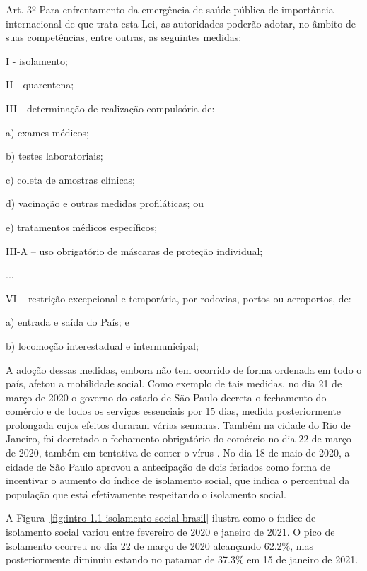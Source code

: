 \begin{citacao}
Art. 3º  Para enfrentamento da emergência de saúde pública de importância internacional de que trata esta Lei, as autoridades poderão adotar, no âmbito de suas competências, entre outras, as seguintes medidas:

I - isolamento;

II - quarentena;

III - determinação de realização compulsória de:

a) exames médicos;
    
b) testes laboratoriais;
    
c) coleta de amostras clínicas;
    
d) vacinação e outras medidas profiláticas; ou 
    
e) tratamentos médicos específicos;
    
III-A – uso obrigatório de máscaras de proteção individual; 

...

VI – restrição excepcional e temporária, por rodovias, portos ou aeroportos, de: 

a) entrada e saída do País; e
    
b) locomoção interestadual e intermunicipal;
\end{citacao}

A adoção dessas medidas, embora não tem ocorrido de forma ordenada em todo o país, afetou a mobilidade social. Como exemplo de tais medidas, no dia 21 de março de 2020 o governo do estado de São Paulo \cite{artigo:folha:sp-fechamento-comercio} decreta o fechamento do comércio e de todos os serviços essenciais por 15 dias, medida posteriormente prolongada cujos efeitos duraram várias semanas. Também na cidade do Rio de Janeiro, foi decretado o fechamento obrigatório do comércio no dia 22 de março de 2020, também em tentativa de conter o vírus \cite{artigo:uol:rj-fechamento-comercio}. No dia 18 de maio de 2020, a cidade de São Paulo aprovou a antecipação de dois feriados \cite{artigo:folha:sao-paulo-aprova-feriados} como forma de incentivar o aumento do índice de isolamento social, que indica o percentual da população que está efetivamente respeitando o isolamento social.

A Figura~\ref{fig:intro-1.1-isolamento-social-brasil} ilustra como o índice de isolamento social variou entre fevereiro de 2020 e janeiro de 2021. O pico de isolamento ocorreu no dia 22 de março de 2020 alcançando 62.2\%, mas posteriormente diminuiu estando no patamar de 37.3\% em 15 de janeiro de 2021.

